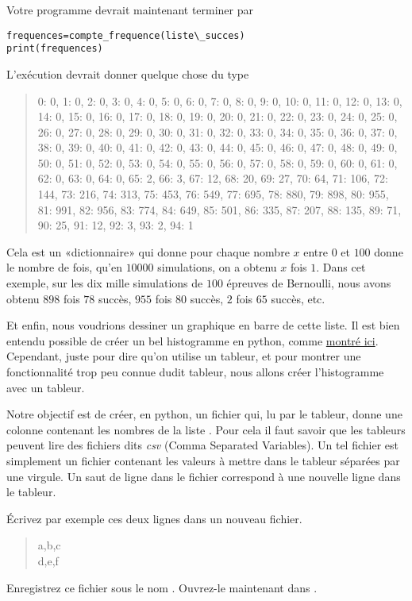 Votre programme devrait maintenant terminer par
\begin{verbatim}
frequences=compte_frequence(liste\_succes)
print(frequences)
\end{verbatim}

L'exécution devrait donner quelque chose du type
\begin{quote}
{0: 0, 1: 0, 2: 0, 3: 0, 4: 0, 5: 0, 6: 0, 7: 0, 8: 0, 9: 0, 10: 0, 11: 0, 12: 0, 13: 0, 14: 0, 15: 0, 16: 0, 17: 0, 18: 0, 19: 0, 20: 0, 21: 0, 22: 0, 23: 0, 24: 0, 25: 0, 26: 0, 27: 0, 28: 0, 29: 0, 30: 0, 31: 0, 32: 0, 33: 0, 34: 0, 35: 0, 36: 0, 37: 0, 38: 0, 39: 0, 40: 0, 41: 0, 42: 0, 43: 0, 44: 0, 45: 0, 46: 0, 47: 0, 48: 0, 49: 0, 50: 0, 51: 0, 52: 0, 53: 0, 54: 0, 55: 0, 56: 0, 57: 0, 58: 0, 59: 0, 60: 0, 61: 0, 62: 0, 63: 0, 64: 0, 65: 2, 66: 3, 67: 12, 68: 20, 69: 27, 70: 64, 71: 106, 72: 144, 73: 216, 74: 313, 75: 453, 76: 549, 77: 695, 78: 880, 79: 898, 80: 955, 81: 991, 82: 956, 83: 774, 84: 649, 85: 501, 86: 335, 87: 207, 88: 135, 89: 71, 90: 25, 91: 12, 92: 3, 93: 2, 94: 1}
\end{quote}
Cela est un «dictionnaire» qui donne pour chaque nombre \( x\) entre \( 0\) et \( 100\) donne le nombre de fois, qu'en $10000$ simulations, on a obtenu \( x\) fois \( 1\). Dans cet exemple, sur les dix mille simulations de \( 100\) épreuves de Bernoulli, nous avons obtenu \( 898\) fois \( 78\) succès, \( 955\) fois \( 80\) succès, \( 2\) fois \( 65\) succès, etc.

Et enfin, nous voudrions dessiner un graphique en barre de cette liste. Il est bien entendu possible de créer un bel histogramme en python, comme \href{http://matplotlib.org/users/screenshots.html}{montré ici}. Cependant, juste pour dire qu'on utilise un tableur, et pour montrer une fonctionnalité trop peu connue dudit tableur, nous allons créer l'histogramme avec un tableur.

Notre objectif est de créer, en python, un fichier qui, lu par le tableur, donne une colonne contenant les nombres de la liste . Pour cela il faut savoir que les tableurs peuvent lire des fichiers dits \emph{csv} (Comma Separated Variables). Un tel fichier est simplement un fichier contenant les valeurs à mettre dans le tableur séparées par une virgule. Un saut de ligne dans le fichier correspond à une nouvelle ligne dans le tableur.

Écrivez par exemple ces deux lignes dans un nouveau fichier.
\begin{quote}
    a,b,c\\
    d,e,f
\end{quote}
Enregistrez ce fichier sous le nom . Ouvrez-le maintenant dans .


